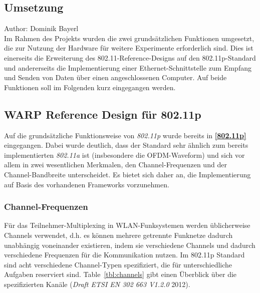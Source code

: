\documentclass[letterpaper,11pt]{article}
\newcommand{\starnamesingular}{}
\newcommand{\Xrefname}[1]{\protect\renewcommand{\starnamesingular}{#1}}
\providecommand{\Cref}{\starnamesingular~\ref}
\begin{document}
\begin{onehalfspace}
\small
\normalsize
 
\newpage
\section{ Umsetzung}\label{umsetzung}
\small Author: Dominik Bayerl\\
\Large
Im Rahmen des Projekts wurden die zwei grundsätzlichen Funktionen
umgesetzt, die zur Nutzung der Hardware für weitere Experimente
erforderlich sind. Dies ist einerseits die Erweiterung des
802.11-Reference-Designs auf den 802.11p-Standard und andererseits die
Implementierung einer Ethernet-Schnittstelle zum Empfang und Senden von
Daten über einen angeschlossenen Computer. Auf beide Funktionen soll im
Folgenden kurz eingegangen werden.

\subsection{ WARP Reference Design für
802.11p}\label{warp-reference-design-fuxfcr-802.11p}

Auf die grundsätzliche Funktionsweise von \emph{802.11p} wurde bereits
in \textbf{\autoref{802.11p}} eingegangen. Dabei wurde deutlich,
dass der Standard sehr ähnlich zum bereits implementierten
\emph{802.11a} ist (insbesondere die OFDM-Waveform) und sich vor allem
in zwei wesentlichen Merkmalen, den Channel-Frequenzen und der
Channel-Bandbreite unterscheidet. Es bietet sich daher an, die
Implementierung auf Basis des vorhandenen Frameworks vorzunehmen.

\subsubsection{Channel-Frequenzen}\label{channel-frequenzen}

Für das Teilnehmer-Multiplexing in WLAN-Funksystemen werden
üblicherweise Channels verwendet, d.h. es können mehrere getrennte
Funknetze dadurch unabhängig voneinander existieren, indem sie
verschiedene Channels und dadurch verschiedene Frequenzen für die
Kommunikation nutzen. Im 802.11p Standard sind acht verschiedene
Channel-Typen spezifiziert, die für unterschiedliche Aufgaben reserviert
sind. \Xrefname{Table}\Cref{tbl:channels} gibt einen Überblick über die
spezifizierten Kanäle (\emph{Draft ETSI EN 302 663 V1.2.0} 2012).


\end{onehalfspace}
\end{document}
